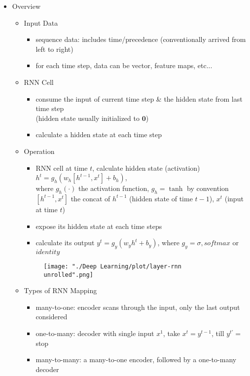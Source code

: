 \begin{itemize}
\item Overview
	\begin{itemize}
	\item Input Data
		\begin{itemize}
		\item sequence data: includes time/precedence (conventionally arrived from left to right)
		\item for each time step, data can be vector, feature maps, etc...
		\end{itemize}
	\item RNN Cell
		\begin{itemize}
		\item consume the input of current time step \& the hidden state from last time step \\
		(hidden state usually initialized to $\mathbf 0$)
		\item calculate a hidden state at each time step
		\end{itemize}
	\item Operation
		\begin{itemize}
		\item RNN cell at time $t$, calculate hidden state (activation) $h^t = g_h(w_{h}[h^{t-1},x^t] + b_h)$, \\ 
		where $g_h(\cdot)$ the activation function, $g_h=\tanh$ by convention \\
		$[h^{t-1}, x^t]$ the concat of $h^{t-1}$ (hidden state of time $t-1$), $x^t$ (input at time $t$)
		\item expose its hidden state at each time steps
		\item calculate its output $y^t=g_y(w_{y}h^t+b_y)$, where $g_y=\sigma, softmax$ or $identity$
		\end{itemize}
		\begin{figure}[ht]
		\texttt{[image: "./Deep Learning/plot/layer-rnn unrolled".png]}
		\end{figure}
	\item Types of RNN Mapping
		\begin{itemize}
		\item many-to-one: encoder scans through the input, only the last output considered
		\item one-to-many: decoder with single input $x^1$, take $x^t=y^{t-1}$, till $y^{t'}=$ stop
		\item many-to-many: a many-to-one encoder, followed by a one-to-many decoder \\

\end{itemize}
\end{itemize}
\end{itemize}
